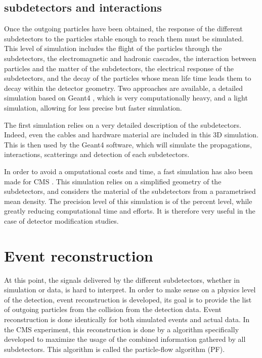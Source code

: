 \subsection{subdetectors and interactions}

Once the outgoing particles have been obtained, the response of the different subdetectors to the particles stable enough to reach them must be simulated. This level of simulation includes the flight of the particles through the subdetectors, the electromagnetic and hadronic cascades, the interaction between particles and the matter of the subdetectors, the electrical response of the subdetectors, and the decay of the particles whose mean life time leads them to decay within the detector geometry. Two approaches are available, a detailed simulation based on Geant4 \cite{}, which is very computationally heavy, and a light simulation, allowing for less precise but faster simulation.

The first simulation relies on a very detailed description of the subdetectors. Indeed, even the cables and hardware material are included in this 3D simulation. This is then used by the Geant4 software, which will simulate the propagations, interactions, scatterings and detection of each subdetectors.

In order to avoid a omputational costs and time, a fast simulation has also been made for CMS \cite{}. This simulation relies on a simplified geometry of the subdetectors, and considers the material of the subdetectors from a parametrised mean density. The precision level of this simulation is of the percent level, while greatly reducing computational time and efforts. It is therefore very useful in the case of detector modification studies.

\section{Event reconstruction}
\label{sec:cms_physics_event_reconstruction}

At this point, the signals delivered by the different subdetectors, whether in simulation or data, is hard to interpret. In order to make sense on a physics level of the detection, event reconstruction is developed, its goal is to provide the list of outgoing particles from the collision from the detection data. Event reconstruction is done identically for both simulated events and actual data. In the CMS experiment, this reconstruction is done by a algorithm specifically developed to maximize the usage of the combined information gathered by all subdetectors. This algorithm is called the particle-flow algorithm (PF). 

